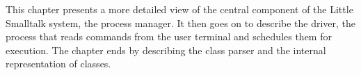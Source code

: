 \secdown

This chapter presents a more detailed view of the central component of the
Little Smalltalk system, the process manager. It then goes on to describe the
driver, the process that reads commands from the user terminal and schedules
them for execution. The chapter ends by describing the class parser and the
internal representation of classes.


\secup
